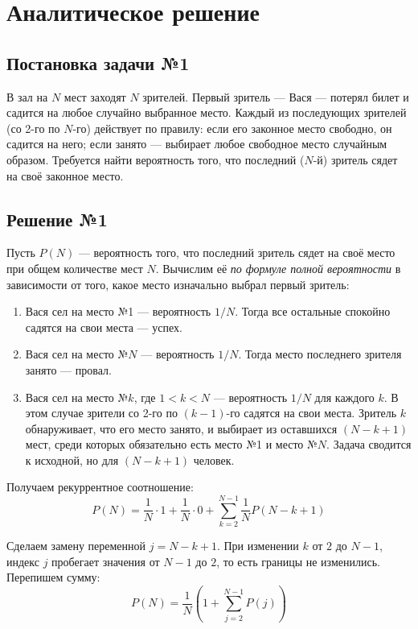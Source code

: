 \documentclass[12pt]{article}
\begin{document}
\section*{Аналитическое решение}

\subsection*{Постановка задачи №1}
В зал на $N$ мест заходят $N$ зрителей. Первый зритель --- Вася --- потерял билет и садится на любое случайно выбранное место. Каждый из последующих зрителей (со 2-го по $N$-го) действует по правилу: если его законное место свободно, он садится на него; если занято — выбирает любое свободное место случайным образом. Требуется найти вероятность того, что последний ($N$-й) зритель сядет на своё законное место.

\subsection*{Решение №1}
Пусть $P(N)$ — вероятность того, что последний зритель сядет на своё место при общем количестве мест $N$. Вычислим её \textit{по формуле полной вероятности} в зависимости от того, какое место изначально выбрал первый зритель:

\begin{enumerate}
    \item Вася сел на место №1 --- вероятность $1/N$. Тогда все остальные спокойно садятся на свои места --- успех.
    \item Вася сел на место №$N$ --- вероятность $1/N$. Тогда место последнего зрителя занято --- провал.
    \item Вася сел на место №$k$, где $1 < k < N$ --- вероятность $1/N$ для каждого $k$. В этом случае зрители со 2-го по $(k-1)$-го садятся на свои места. Зритель $k$ обнаруживает, что его место занято, и выбирает из оставшихся $(N - k + 1)$ мест, среди которых обязательно есть место №1 и место №$N$. Задача сводится к исходной, но для $(N - k + 1)$ человек.
\end{enumerate}

Получаем рекуррентное соотношение:
$$ P(N) = \frac{1}{N} \cdot 1 + \frac{1}{N} \cdot 0 + \sum_{k=2}^{N-1} \frac{1}{N} P(N - k + 1) $$

Сделаем замену переменной $j = N - k + 1$. При изменении $k$ от $2$ до $N-1$, индекс $j$ пробегает значения от $N-1$ до $2$, то есть границы не изменились. Перепишем сумму:
$$ P(N) = \frac{1}{N} \left( 1 + \sum_{j=2}^{N-1} P(j) \right) $$
\end{document}
